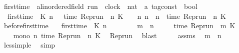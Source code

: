 \begin{isabellebody}
\isanewline
{}\isamarkupfalse%
\ first{\isacharunderscore}time\ {\isacharcolon}{\isacharcolon}\ {\isacartoucheopen}{\isacharprime}a{\isacharcolon}{\isacharcolon}linordered{\isacharunderscore}field\ run\ {\isasymRightarrow}\ clock\ {\isasymRightarrow}\ nat\ {\isasymRightarrow}\ {\isacharprime}a\ tag{\isacharunderscore}const\ {\isasymRightarrow}\ bool{\isacartoucheclose}\isanewline
{}\isanewline
\ \ {\isacartoucheopen}first{\isacharunderscore}time\ {\isasymrho}\ K\ n\ {\isasymtau}\ {\isasymequiv}\ {\isacharparenleft}time\ {\isacharparenleft}{\isacharparenleft}Rep{\isacharunderscore}run\ {\isasymrho}{\isacharparenright}\ n\ K{\isacharparenright}\ {\isacharequal}\ {\isasymtau}{\isacharparenright}\ {\isasymand}\ {\isacharparenleft}{\isasymnexists}n{\isacharprime}{\isachardot}\ n{\isacharprime}\ {\isacharless}\ n\ {\isasymand}\ time\ {\isacharparenleft}{\isacharparenleft}Rep{\isacharunderscore}run\ {\isasymrho}{\isacharparenright}\ n{\isacharprime}\ K{\isacharparenright}\ {\isacharequal}\ {\isasymtau}{\isacharparenright}{\isacartoucheclose}\isanewline
\isanewline
{}\isamarkupfalse%
\ before{\isacharunderscore}first{\isacharunderscore}time{\isacharcolon}\isanewline
\ \ \ {\isacartoucheopen}first{\isacharunderscore}time\ {\isasymrho}\ K\ n\ {\isasymtau}{\isacartoucheclose}\isanewline
\ \ \ \ \ \ \ {\isacartoucheopen}m\ {\isacharless}\ n{\isacartoucheclose}\isanewline
\ \ \ \ \ {\isacartoucheopen}time\ {\isacharparenleft}{\isacharparenleft}Rep{\isacharunderscore}run\ {\isasymrho}{\isacharparenright}\ m\ K{\isacharparenright}\ {\isacharless}\ {\isasymtau}{\isacartoucheclose}\isanewline
%
\isadelimproof
%
\endisadelimproof
%
\isatagproof
{}\isamarkupfalse%
\ {\isacharminus}\isanewline
\ \ \isamarkupfalse%
\ {\isacartoucheopen}mono\ {\isacharparenleft}{\isasymlambda}n{\isachardot}\ time\ {\isacharparenleft}Rep{\isacharunderscore}run\ {\isasymrho}\ n\ K{\isacharparenright}{\isacharparenright}{\isacartoucheclose}\ \isamarkupfalse%
\ Rep{\isacharunderscore}run\ \isamarkupfalse%
\ blast\isanewline
\ \ \isamarkupfalse%
\ \isamarkupfalse%
\ assms{\isacharparenleft}{}{\isacharparenright}\ \isamarkupfalse%
\ {\isacartoucheopen}m\ {\isasymle}\ n{\isacartoucheclose}\ \isamarkupfalse%
\ less{\isacharunderscore}imp{\isacharunderscore}le\ \isamarkupfalse%
\ simp\isanewline
\ \ \isamarkupfalse%

\end{isabellebody}
